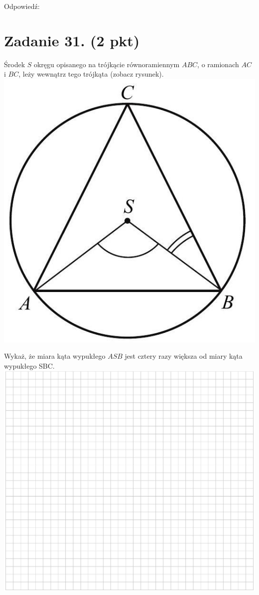 \documentclass[10pt]{article}
\begin{document}
Odpowiedź:

\section*{Zadanie 31. (2 pkt)}
Środek \(S\) okręgu opisanego na trójkącie równoramiennym \(A B C\), o ramionach \(A C\) i \(B C\), leży wewnątrz tego trójkąta (zobacz rysunek).\\
\includegraphics[max width=\textwidth, center]{2024_11_21_0c267759828927e3a26dg-15}

Wykaż, że miara kąta wypukłego \(A S B\) jest cztery razy większa od miary kąta wypukłego SBC.\\
\includegraphics[max width=\textwidth, center]{2024_11_21_0c267759828927e3a26dg-15(1)}
\end{document}
